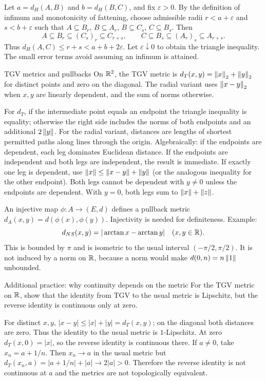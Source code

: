 \begin{answer}
Let $a=d_H(A,B)$ and $b=d_H(B,C)$, and fix $\varepsilon>0$. By the definition of infimum and monotonicity of fattening, choose admissible radii $r<a+\varepsilon$ and $s<b+\varepsilon$ such that $A\subseteq B_r$, $B\subseteq A_r$, $B\subseteq C_s$, $C\subseteq B_s$. Then
\[A\subseteq B_r\subseteq(C_s)_r\subseteq C_{r+s},\qquad C\subseteq B_s\subseteq(A_r)_s\subseteq A_{r+s}.\]
Thus $d_H(A,C)\le r+s<a+b+2\varepsilon$. Let $\varepsilon\downarrow0$ to obtain the triangle inequality. The small error terms avoid assuming an infimum is attained.
\end{answer}
\begin{note}{TGV metrics and pullbacks}
On $\mathbb R^2$, the TGV metric is $d_T(x,y)=\left\lVert x\right\rVert_2+\left\lVert y\right\rVert_2$ for distinct points and zero on the diagonal. The radial variant uses $\left\lVert x-y\right\rVert_2$ when $x,y$ are linearly dependent, and the sum of norms otherwise.

For $d_T$, if the intermediate point equals an endpoint the triangle inequality is equality; otherwise the right side includes the norms of both endpoints and an additional $2\left\lVert y\right\rVert$. For the radial variant, distances are lengths of shortest permitted paths along lines through the origin. Algebraically: if the endpoints are dependent, each leg dominates Euclidean distance. If the endpoints are independent and both legs are independent, the result is immediate. If exactly one leg is dependent, use $\left\lVert x\right\rVert\le\left\lVert x-y\right\rVert+\left\lVert y\right\rVert$ (or the analogous inequality for the other endpoint). Both legs cannot be dependent with $y\ne0$ unless the endpoints are dependent. With $y=0$, both legs sum to $\left\lVert x\right\rVert+\left\lVert z\right\rVert$.

An injective map $\phi:A\to(E,d)$ defines a pullback metric $d_A(x,y)=d(\phi(x),\phi(y))$. Injectivity is needed for definiteness. Example:
\[d_{NS}(x,y)=|\arctan x-\arctan y|\quad(x,y\in\mathbb R).\]
This is bounded by $\pi$ and is isometric to the usual interval $(-\pi/2,\pi/2)$. It is not induced by a norm on $\mathbb R$, because a norm would make $d(0,n)=n\left\lVert1\right\rVert$ unbounded.
\end{note}
\begin{exam}{Additional practice: why continuity depends on the metric}
For the TGV metric on $\mathbb R$, show that the identity from TGV to the usual metric is Lipschitz, but the reverse identity is continuous only at zero.
\end{exam}
\begin{answer}
For distinct $x,y$, $|x-y|\le|x|+|y|=d_T(x,y)$; on the diagonal both distances are zero. Thus the identity to the usual metric is $1$-Lipschitz. At zero $d_T(x,0)=|x|$, so the reverse identity is continuous there. If $a\ne0$, take $x_n=a+1/n$. Then $x_n\to a$ in the usual metric but $d_T(x_n,a)=|a+1/n|+|a|\to2|a|>0$. Therefore the reverse identity is not continuous at $a$ and the metrics are not topologically equivalent.
\end{answer}


